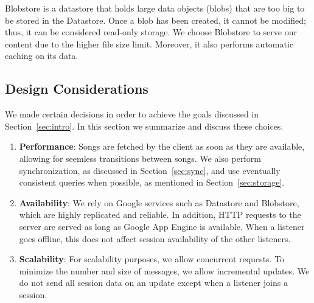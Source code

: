 Blobstore is a datastore that holds large data objects (blobs) that 
are too big to be stored in the Datastore. Once a blob has been 
created, it cannot be modified; thus, it can be considered read-only
storage. We choose Blobstore to serve our content due to the higher
file size limit. Moreover, it also performs automatic caching on its 
data. \cite{appengine}

\subsection{Design Considerations}
\label{sec:considerations}
We made certain decisions in order to achieve the goals discussed
in Section~\ref{sec:intro}. In this section we summarize and discuss these choices.
\begin{enumerate}
  \item \textbf{Performance}: Songs are fetched by the client as soon as they are available, 
  		allowing for seemless transitions between songs.
  		We also perform synchronization, as discussed in Section~\ref{sec:sync}, 
  		and use eventually consistent queries when possible, as mentioned in 
  		Section~\ref{sec:storage}.
  \item \textbf{Availability}: We rely on Google services such as 
  		Datastore and Blobstore, which are highly replicated and reliable. 
  		In addition, HTTP requests to the server are served as long as 
  		Google App Engine is available. When a listener goes offline,
  		this does not affect session availability of the other listeners. 
  \item \textbf{Scalability}: For scalability purposes, we allow concurrent requests.
  		To minimize the number and size of messages, we allow incremental
  		updates. We do not send all session data on an update except when
  		a listener joins a session.
\end{enumerate}
